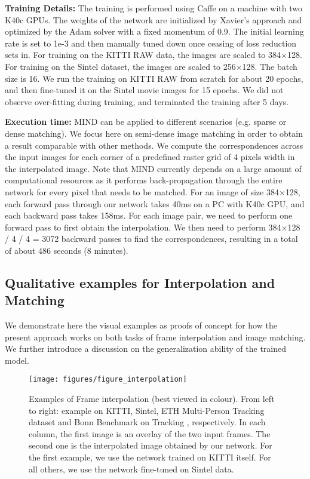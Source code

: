 \documentclass[runningheads]{llncs}
\begin{document}
	\vspace{+0.1cm}			
	\noindent\textbf{Training Details:} The training is performed using Caffe \cite{jia2014caffe} on a machine with two K40c GPUs. The weights of the network are initialized by Xavier's approach \cite{glorot2010understanding} and optimized by the Adam solver \cite{kingma2014adam} with a fixed momentum of 0.9. The initial learning rate is set to 1e-3 and then manually tuned down once ceasing of loss reduction sets in. For training on the KITTI RAW data, the images are scaled to 384$\times$128. For training on the Sintel dataset, the images are scaled to 256$\times$128. The batch size is 16. We run the training on KITTI RAW from scratch for about 20 epochs, and then fine-tuned it on the Sintel movie images for 15 epochs. We did not observe over-fitting during training, and terminated the training after 5 days.
	
	\vspace{+0.1cm}
	\noindent\textbf{Execution time:} MIND can be applied to different scenarios (e.g. sparse or dense matching). We focus here on semi-dense image matching in order to obtain a result comparable with other methods. We compute the correspondences across the input images for each corner of a predefined raster grid of 4 pixels width in the interpolated image. Note that MIND currently depends on a large amount of computational resources as it performs back-propagation through the entire network for every pixel that needs to be matched. For an image of size 384$\times$128, each forward pass through our network takes 40ms on a PC with K40c GPU, and each backward pass takes 158ms. For each image pair, we need to perform one forward pass to first obtain the interpolation. We then need to perform 384$\times$128 / 4 / 4 = 3072 backward passes to find the correspondences, resulting in a total of about 486 seconds (8 minutes).

	\subsection{Qualitative examples for Interpolation and Matching}
	\label{sec:examples}
	
	We demonstrate here the visual examples as proofs of concept for how the present approach works on both tasks of frame interpolation and image matching. We further introduce a discussion on the generalization ability of the trained model.
	
	\begin{figure*}[t]
		\centering
		\texttt{[image: figures/figure\_interpolation]}
		\caption{Examples of Frame interpolation (best viewed in colour). From left to right: example on KITTI, Sintel, ETH Multi-Person Tracking dataset\cite{ess2009robust} and Bonn Benchmark on Tracking \cite{KleinIROS10}, respectively. In each column, the first image is an overlay of the two input frames. The second one is the interpolated image obtained by our network. For the first example, we use the network trained on KITTI itself. For all others, we use the network fine-tuned on Sintel data.}
		\label{fig:Interpolation_examples}
	\end{figure*}	
	
\end{document}
